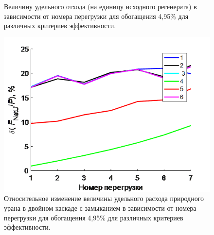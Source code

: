\begin{figure}[ht]
\begin{minipage}{.5\textwidth}
      \caption{Величину удельного отхода (на единицу исходного регенерата) в зависимости от номера перегрузки для обогащения 4,95\% для различных критериев эффективности.}
      \label{5}
    \end{minipage}
    \begin{minipage}{.5\textwidth}
      \centering
      \includegraphics[width=.8\linewidth]{images/net/6}  
      \caption{Относительное изменение величины удельного расхода природного урана в двойном каскаде с замыканием в зависимости от номера перегрузки для обогащения 4,95\% для различных критериев эффективности.}
      \label{6}
    \end{minipage}
\end{figure}




